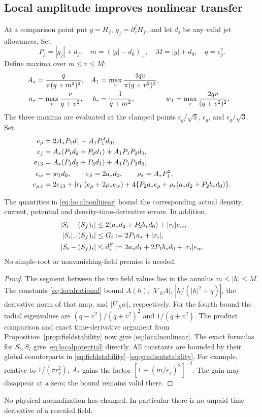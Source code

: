 \subsection{Local amplitude improves nonlinear transfer}
At a comparison point put $g=H_f$, $g_j=\partial_z^jH_f$, and let
$d_j$ be any valid jet allowances. Set
\[
 P_j=|g_j|+d_j,\quad m=(|g|-d_0)_+,\quad M=|g|+d_0,\quad q=\epsilon_g^2.
\]
Define maxima over $m\le v\le M$:
\begin{align}
 A_*&=\frac{q}{\pi(q+m^2)^2},&
 A_1&=\max_v\frac{4qv}{\pi(q+v^2)^3},\notag\\
 a_*&=\max_v\frac{v}{q+v^2},& b_*&=\frac1{q+m^2},&
 w_1&=\max_v\frac{2qv}{(q+v^2)^2}.\label{eq:localrational}
\end{align}
The three maxima are evaluated at the clamped points
$\epsilon_g/\sqrt5$, $\epsilon_g$, and $\epsilon_g/\sqrt3$.
Set
\begin{align}
 e_\rho&=2A_*P_1d_1+A_1P_1^2d_0,\notag\\
 e_j&=A_*(P_1d_2+P_2d_1)+A_1P_1P_2d_0,\notag\\
 e_{13}&=A_*(P_1d_3+P_3d_1)+A_1P_1P_3d_0,\notag\\
 e_w&=w_1d_0,\qquad e_S=2a_*d_0,\qquad \rho_*=A_*P_1^2,\notag\\
 e_{\rho,t}&=2e_{13}+|r_t|(e_\rho+2\rho_*e_w)
 +4\{P_2a_*e_\rho+\rho_*(a_*d_2+P_2b_*d_0)\}.
 \label{eq:localnonlinear}
\end{align}

\begin{proposition}\label{prop:localnonlinear}
The quantities in \eqref{eq:localnonlinear} bound the corresponding
actual density, current, potential and density-time-derivative errors.
In addition,
\begin{align}
 |S_t-(S_f)_t|&\le2(a_*d_2+P_2b_*d_0)+|r_t|e_w,\notag\\
 |S_i|,|(S_f)_i|&\le G_i:=2P_1a_*+|r_i|,\notag\\
 |S_i-(S_f)_i|&\le d_i^S:=2a_*d_1+2P_1b_*d_0+|r_i|e_w.
 \label{eq:localpotential}
\end{align}
No simple-root or nonvanishing-field premise is needed.
\end{proposition}
\begin{proof}
The segment between the two field values lies in the annulus
$m\le|h|\le M$. The constants \eqref{eq:localrational} bound
$A(h)$, $|\nabla_h A|$, $|h/(|h|^2+q)|$, the derivative norm of
that map, and $|\nabla_h w|$, respectively.
For the fourth bound the radial eigenvalues are
$(q-v^2)/(q+v^2)^2$ and $1/(q+v^2)$.
The product comparison and exact time-derivative argument from
Proposition~\ref{prop:fieldstability} now give
\eqref{eq:localnonlinear}. The exact formulas for $S_t,S_i$ give
\eqref{eq:localpotential} directly.
All constants are bounded by their global counterparts in
\eqref{eq:fieldstability}--\eqref{eq:gradientstability}.
For example, relative to $1/(\pi\epsilon_g^2)$, $A_*$ gains the
factor $[1+(m/\epsilon_g)^2]^{-2}$.
The gain may disappear at a zero; the bound remains valid there.
\end{proof}
No physical normalization has changed. In particular there is no
unpaid time derivative of a rescaled field.

